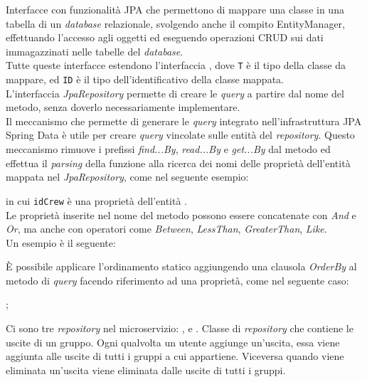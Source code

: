 \label{Repository}
Interfacce con funzionalità \gls{JPA} che permettono di mappare una classe in una tabella di un \textit{database} relazionale, svolgendo anche il compito \gls{EntityManager}, effettuando l'accesso agli oggetti ed eseguendo operazioni \gls{CRUD} sui dati immagazzinati nelle tabelle del \textit{database}.\\
Tutte queste interfacce estendono l'interfaccia , dove \texttt{T} è il tipo della classe da mappare, ed \texttt{ID} è il tipo dell'identificativo della classe mappata.\\
L'interfaccia \textit{JpaRepository} permette di creare le \textit{query} a partire dal nome del metodo, senza doverlo necessariamente implementare.\\
Il meccanismo che permette di generare le \textit{query} integrato nell'infrastruttura JPA Spring Data è utile per creare \textit{query} vincolate sulle entità del \textit{repository}. Questo meccanismo rimuove i prefissi \textit{find...By}, \textit{read...By} e \textit{get...By} dal metodo ed effettua il \textit{parsing} della funzione alla ricerca dei nomi delle proprietà dell'entità mappata nel \textit{JpaRepository}, come nel seguente esempio: 
\begin{center}
\end{center}
in cui \texttt{idCrew} è una proprietà dell'entità .\\ 
 Le proprietà inserite nel nome del metodo possono essere concatenate con \textit{And} e \textit{Or}, ma anche con operatori come \textit{Between}, \textit{LessThan}, \textit{GreaterThan}, \textit{Like}. \\
 Un esempio è il seguente: 
 \begin{center}
 \end{center}
È possibile applicare l'ordinamento statico aggiungendo una clausola \textit{OrderBy} al metodo di \textit{query} facendo riferimento ad una proprietà, come nel seguente caso:  
\begin{center}
    ;
\end{center}
Ci sono tre \textit{repository} nel \gls{microservizio}: ,  e . 
\label{JointUsciteCrewRepository}
Classe di \textit{repository} che contiene le uscite di un gruppo. Ogni qualvolta un utente aggiunge un'uscita, essa viene aggiunta alle uscite di tutti i gruppi a cui appartiene. Viceversa quando viene eliminata un'uscita viene eliminata dalle uscite di tutti i gruppi.\\
